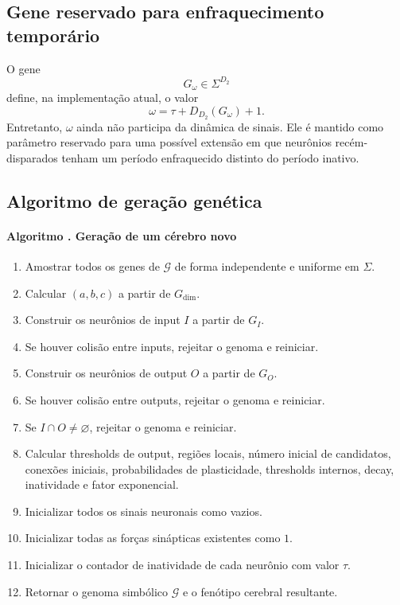 \documentclass[12pt,a4paper,fleqn]{article}
\newcommand{\SigmaGen}{\Sigma}
\newcounter{algoritmo}
\newcommand{\algoritmo}[1]{\refstepcounter{algoritmo}\paragraph{Algoritmo \thealgoritmo. #1}}
\begin{document}
\subsection{Gene reservado para enfraquecimento temporário}

O gene
$$
	G_\omega\in\SigmaGen^{D_2}
$$
define, na implementação atual, o valor
$$
	\omega=\tau+D_{D_2}(G_\omega)+1.
$$
Entretanto, $\omega$ ainda não participa da dinâmica de sinais. Ele é mantido como parâmetro reservado para uma possível extensão em que neurônios recém-disparados tenham um período enfraquecido distinto do período inativo.

\subsection{Algoritmo de geração genética}

\algoritmo{Geração de um cérebro novo}

\begin{enumerate}
	\item Amostrar todos os genes de $\mathcal{G}$ de forma independente e uniforme em $\SigmaGen$.
	\item Calcular $(a,b,c)$ a partir de $G_{\dim}$.
	\item Construir os neurônios de input $I$ a partir de $G_I$.
	\item Se houver colisão entre inputs, rejeitar o genoma e reiniciar.
	\item Construir os neurônios de output $O$ a partir de $G_O$.
	\item Se houver colisão entre outputs, rejeitar o genoma e reiniciar.
	\item Se $I\cap O\neq\varnothing$, rejeitar o genoma e reiniciar.
	\item Calcular thresholds de output, regiões locais, número inicial de candidatos, conexões iniciais, probabilidades de plasticidade, thresholds internos, decay, inatividade e fator exponencial.
	\item Inicializar todos os sinais neuronais como vazios.
	\item Inicializar todas as forças sinápticas existentes como $1$.
	\item Inicializar o contador de inatividade de cada neurônio com valor $\tau$.
	\item Retornar o genoma simbólico $\mathcal{G}$ e o fenótipo cerebral resultante.
\end{enumerate}
\end{document}
